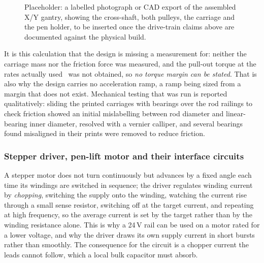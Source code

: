 
\begin{figure}[htb]
\centering
{}
\captionsetup{singlelinecheck=false,justification=justified}
\caption{Placeholder: a labelled photograph or CAD export of the assembled X/Y gantry, showing the cross-shaft, both pulleys, the carriage and the pen holder, to be inserted once the drive-train claims above are documented against the physical build.}
\label{fig:gan-cad}
\end{figure}

It is this calculation that the design is missing a measurement for: neither the carriage mass nor the friction force was measured, and the pull-out torque at the rates actually used~\cite{acarnley2002,stepperds} was not obtained, so \emph{no torque margin can be stated}. That is also why the design carries no acceleration ramp, a ramp being sized from a margin that does not exist. Mechanical testing that was run is reported qualitatively: sliding the printed carriages with bearings over the rod railings to check friction showed an initial mislabelling between rod diameter and linear-bearing inner diameter, resolved with a vernier calliper, and several bearings found misaligned in their prints were removed to reduce friction.

\subsubsection{Stepper driver, pen-lift motor and their interface circuits}
\label{sec:gan-components}
\label{sec:gan-supply}

A stepper motor does not turn continuously but advances by a fixed angle each time its windings are switched in sequence; the driver regulates winding current by \emph{chopping}, switching the supply onto the winding, watching the current rise through a small sense resistor, switching off at the target current, and repeating at high frequency, so the average current is set by the target rather than by the winding resistance alone. This is why a 24\,V rail can be used on a motor rated for a lower voltage, and why the driver draws its own supply current in short bursts rather than smoothly. The consequence for the circuit is a chopper current the leads cannot follow, which a local bulk capacitor must absorb.

